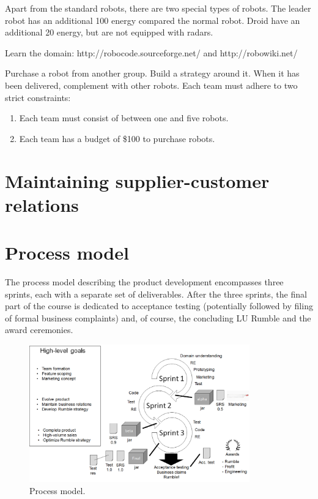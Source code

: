 \documentclass{scrreprt}
\begin{document}
Apart from the standard robots, there are two special types of robots. The leader robot has an additional 100 energy compared the normal robot. Droid have an additional 20 energy, but are not equipped with radars.



Learn the domain: http://robocode.sourceforge.net/ and http://robowiki.net/

Purchase a robot from another group. Build a strategy around it. When it has been delivered, complement with other robots. Each team must adhere to two strict constraints: 

\begin{enumerate}
\item Each team must consist of between one and five robots.
\item Each team has a budget of \$100 to purchase robots.
\end{enumerate}

\chapter{Maintaining supplier-customer relations}

\chapter{Process model} \label{sec:process}
The process model describing the product development encompasses three sprints, each with a separate set of deliverables. 
After the three sprints, the final part of the course is dedicated to acceptance testing (potentially followed by filing of formal business complaints) and, of course, the concluding LU Rumble and the award ceremonies. 

\begin{figure}
\centering
\includegraphics[width=0.85\textwidth]{figures/processModel.png}
\caption{Process model.}
\label{fig:overview}
\end{figure}
\end{document}
